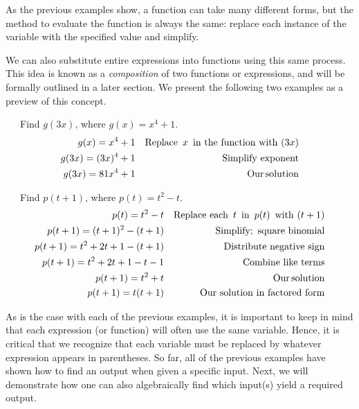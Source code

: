 As the previous examples show, a function can take many different forms, but
the method to evaluate the function is always the same: replace each instance of the variable with the specified value and simplify.
\newpage

We can also substitute entire expressions into functions using this same process.  This idea is known as a \textit{composition} of two functions or expressions, and will be formally outlined in a later section.  We present the following two examples as a preview of this concept.

\begin{example}~~~Find $g(3x)$, where $g(x)=x^4+1$.
  \begin{eqnarray*}
    g (x) = x^4 + 1 &  & \operatorname{Replace~} x \operatorname{~in~the~function~with~}(3 x)\\
    g (3 x) = (3 x)^4 + 1 &  & \operatorname{Simplify~exponent}\\
    g (3 x) = 81 x^4 + 1 &  & \operatorname{Our} \operatorname{solution}
  \end{eqnarray*}
\end{example}

\begin{example}~~~Find $p(t+1)$, where $p(t)=t^2-t$.
  \begin{eqnarray*}
    p (t) = t^2 - t &  & \operatorname{Replace~each~} t
    \operatorname{~in~} p (t) \operatorname{~with~} (t + 1)\\
    p (t + 1) = (t + 1)^2 - (t + 1) &  & \operatorname{Simplify;~square~binomial}\\
    p (t + 1) = t^2 + 2 t + 1 - (t + 1) &  & \operatorname{Distribute~negative~sign}\\
    p (t + 1) = t^2 + 2 t + 1 - t - 1 &  & \operatorname{Combine~like~terms}\\
    p (t + 1) = t^2 + t &  & \operatorname{Our} \operatorname{solution}\\
    p (t + 1) = t(t + 1) &  & \operatorname{Our~solution~in~factored~form}
  \end{eqnarray*}
\end{example}

As is the case with each of the previous examples, it is important to keep in mind that each expression (or function) will often use the same variable.  Hence, it is critical that we recognize that each variable must be replaced by whatever expression appears in parentheses.\pp
So far, all of the previous examples have shown how to find an output when given a specific input.  Next, we will demonstrate how one can also algebraically find which input(s) yield a required output. 


